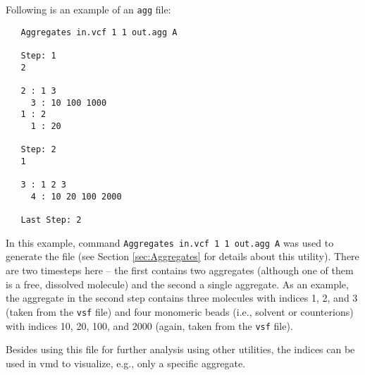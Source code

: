 Following is an example of an \texttt{agg} file:

\begin{verbatim}
   Aggregates in.vcf 1 1 out.agg A

   Step: 1
   2

   2 : 1 3
     3 : 10 100 1000
   1 : 2
     1 : 20

   Step: 2
   1

   3 : 1 2 3
     4 : 10 20 100 2000

   Last Step: 2
\end{verbatim}

In this example, command \texttt{Aggregates in.vcf 1 1 out.agg A} was used
to generate the file (see Section \ref{sec:Aggregates} for details about
this utility). There are two timesteps here -- the first contains two
aggregates (although one of them is a free, dissolved molecule) and the
second a single aggregate.  As an example, the aggregate in the second step
contains three molecules with indices 1, 2, and 3 (taken from the
\texttt{vsf} file) and four monomeric beads (i.e., solvent or counterions)
with indices 10, 20, 100, and 2000 (again, taken from the \texttt{vsf}
file).

Besides using this file for further analysis using other utilities, the
indices can be used in vmd to visualize, e.g., only a specific aggregate.
